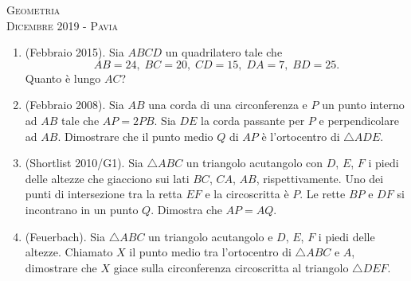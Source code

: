 \documentclass[a4paper]{article}
\theoremstyle{remark}
\theoremstyle{definition}
\begin{document}
\newpage
\begin{center}
	\vspace*{0,5 cm}
	{\Huge \textsc{Geometria}} \\
	\vspace{0,5 cm}
	\textsc{Dicembre 2019 - Pavia}
	\thispagestyle{empty}
	\vspace{0,7 cm}
\end{center}
\normalsize

\begin{enumerate}
	\item (Febbraio 2015).  Sia $ ABCD $ un quadrilatero tale che $$  AB = 24 ,\; BC = 20 ,\; CD = 15 ,\; DA = 7 ,\; BD = 25 . $$ Quanto è lungo $ AC $? 
	
	
	\item (Febbraio 2008). Sia $ AB $ una corda di una circonferenza e $ P $ un punto interno ad $ AB $ tale che $ AP = 2PB $. Sia $ DE $ la corda passante per $ P $ e perpendicolare ad $ AB $. Dimostrare che il punto medio $ Q $ di $ AP $ è l’ortocentro di $ \bigtriangleup ADE $.
	
	\item (Shortlist 2010/G1). Sia $\bigtriangleup ABC $ un triangolo acutangolo con $ D $, $ E $, $ F $ i piedi delle altezze che giacciono sui lati $ BC $, $ CA $, $ AB $, rispettivamente. Uno dei punti di intersezione tra la retta $ EF $ e la circoscritta è $ P $. Le rette $ BP $ e $ DF $ si incontrano in un punto $ Q $. Dimostra che $ AP = AQ $.
	
	\item (Feuerbach). Sia $ \bigtriangleup ABC $ un triangolo acutangolo e $ D $, $ E $, $ F $ i piedi delle altezze. Chiamato $ X $ il punto medio tra l'ortocentro di $\bigtriangleup ABC $ e $ A $, dimostrare che $ X $ giace sulla circonferenza circoscritta al triangolo $\bigtriangleup DEF $.
	
\end{enumerate}
\end{document}
